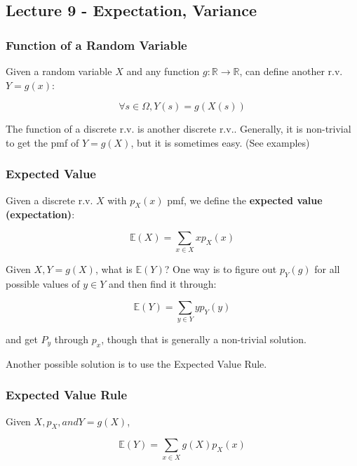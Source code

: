 \documentclass{article}
\begin{document}
\subsection{Lecture 9 - Expectation, Variance}

\subsubsection{Function of a Random Variable}

Given a random variable $X$ and any function $g : \mathbb{R}
\rightarrow \mathbb{R}$, can define another r.v. $Y = g(x)$:

\[
  \forall s \in \Omega, Y(s) = g(X(s))
\]

The function of a discrete r.v. is another discrete r.v.. Generally,
it is non-trivial to get the pmf of $Y=g(X)$, but it is sometimes
easy. (See examples)

\subsubsection{Expected Value}

Given a discrete r.v. $X$ with $p_X(x)$ pmf, we define the
\textbf{expected value (expectation)}:

\begin{equation}
  \tag{Expected Value Definition}
  \boxed{
    \mathbb{E}(X) = \sum\limits_{x \in X} x p_X(x)
  }
\end{equation}

Given $X, Y = g(X)$, what is $\mathbb{E}(Y)$? One way is to figure out
$p_Y(g)$ for all possible values of $y \in Y$ and then find it
through:

\[
  \mathbb{E}(Y) = \sum\limits_{y \in Y} y p_Y(y)
\]

and get $P_y$ through $p_x$, though that is generally a non-trivial
solution.

Another possible solution is to use the Expected Value Rule.

\subsubsection{Expected Value Rule}

Given $X, p_X, and Y=g(X)$,

\begin{equation}
  \tag{Expected Value Rule}
  \boxed{
    \mathbb{E}(Y) = \sum\limits_{x \in X} g(X) p_X(x)
  }
\end{equation}
\end{document}

